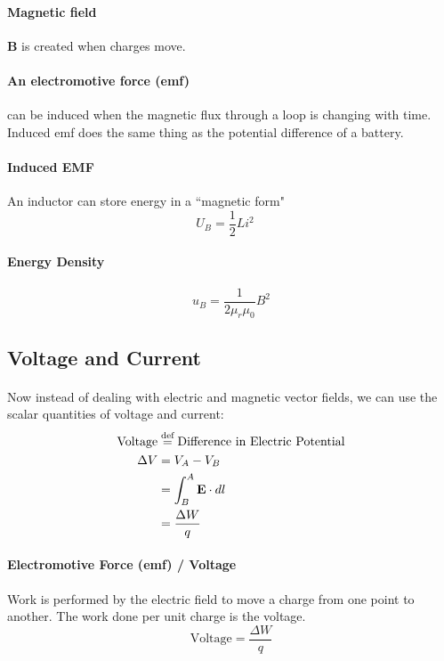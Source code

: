 \documentclass[11pt]{report}
\begin{document}
\paragraph{Magnetic field} \textbf{B} is created when charges move.
\paragraph{An electromotive force (emf)} can be induced when the magnetic flux
through a loop is changing with time. Induced emf does the same thing as the potential difference of a
battery. 
\paragraph{Induced EMF} An inductor can store energy in a ``magnetic form"
\begin{equation}
    U_B = \frac{1}{2} L i^2 \quad 
\end{equation}
\paragraph{Energy Density}
\begin{equation}
    u_B = \frac{1}{2 \mu_r \mu_0} B^2
\end{equation}
\subsection{Voltage and Current}
\paragraph{} Now instead of dealing with electric and magnetic vector fields, we can
use the scalar quantities of voltage and current:
\begin{align}
    \text{Voltage} &\stackrel{\text{def}}{=} \text{Difference in Electric Potential}\nonumber \\ 
    \Delta V &= V_A - V_B \nonumber \\
    &= \int_B^A \textbf{E} \cdot dl \nonumber\\
    &= \frac{\Delta W}{q}
\end{align}

\paragraph{Electromotive Force (emf) / Voltage} Work is performed by 
the electric field to move a charge from one point to another. 
The work done per unit charge is the voltage.
\begin{equation}
    \text{Voltage} = \frac{\Delta W}{q}
\end{equation}
\end{document}
